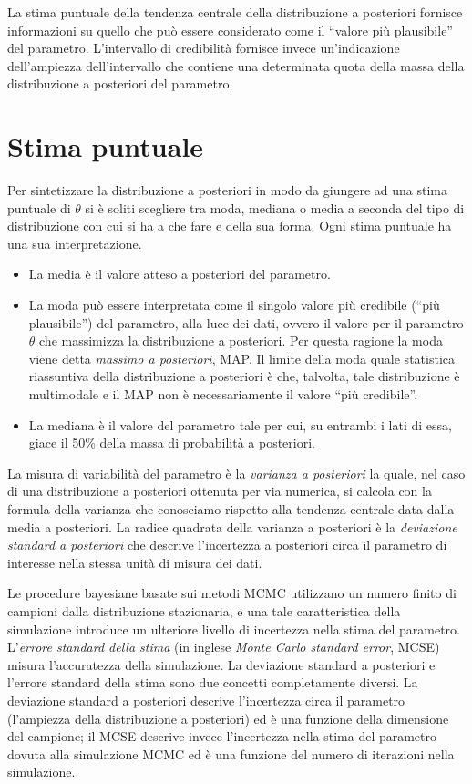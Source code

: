 \documentclass[
  11pt,
]{krantz}
\providecommand{\tightlist}{%
  \setlength{\itemsep}{0pt}\setlength{\parskip}{0pt}}
\theoremstyle{definition}
\theoremstyle{definition}
\theoremstyle{definition}
\theoremstyle{definition}
\theoremstyle{remark}
\begin{document}
La stima puntuale della tendenza centrale della distribuzione a posteriori fornisce informazioni su quello che può essere considerato come il ``valore più plausibile'' del parametro. L'intervallo di credibilità fornisce invece un'indicazione dell'ampiezza dell'intervallo che contiene una determinata quota della massa della distribuzione a posteriori del parametro.

\hypertarget{stima-puntuale}{%
\section{Stima puntuale}\label{stima-puntuale}}

Per sintetizzare la distribuzione a posteriori in modo da giungere ad una stima puntuale di \(\theta\) si è soliti scegliere tra moda, mediana o media a seconda del tipo di distribuzione con cui si ha a che fare e della sua forma. Ogni stima puntuale ha una sua interpretazione.

\begin{itemize}
\tightlist
\item
  La media è il valore atteso a posteriori del parametro.
\item
  La moda può essere interpretata come il singolo valore più credibile (``più plausibile'') del parametro, alla luce dei dati, ovvero il valore per il parametro \(\theta\) che massimizza la distribuzione a posteriori. Per questa ragione la moda viene detta \emph{massimo a posteriori}, MAP. Il limite della moda quale statistica riassuntiva della distribuzione a posteriori è che, talvolta, tale distribuzione è multimodale e il MAP non è necessariamente il valore ``più credibile''.
\item
  La mediana è il valore del parametro tale per cui, su entrambi i lati di essa, giace il 50\% della massa di probabilità a posteriori.
\end{itemize}

La misura di variabilità del parametro è la \emph{varianza a posteriori} la quale, nel caso di una distribuzione a posteriori ottenuta per via numerica, si calcola con la formula della varianza che conosciamo rispetto alla tendenza centrale data dalla media a posteriori. La radice quadrata della varianza a posteriori è la \emph{deviazione standard a posteriori} che descrive l'incertezza a posteriori circa il parametro di interesse nella stessa unità di misura dei dati.

Le procedure bayesiane basate sui metodi MCMC utilizzano un numero finito di campioni dalla distribuzione stazionaria, e una tale caratteristica della simulazione introduce un ulteriore livello di incertezza nella stima del parametro. L'\emph{errore standard della stima} (in inglese \emph{Monte Carlo standard error}, MCSE) misura l'accuratezza della simulazione. La deviazione standard a posteriori e l'errore standard della stima sono due concetti completamente diversi. La deviazione standard a posteriori descrive l'incertezza circa il parametro (l'ampiezza della distribuzione a posteriori) ed è una funzione della dimensione del campione; il MCSE descrive invece l'incertezza nella stima del parametro dovuta alla simulazione MCMC ed è una funzione del numero di iterazioni nella simulazione.
\end{document}
